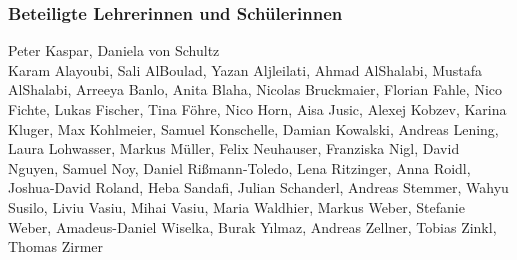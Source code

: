 \subsubsection*{Beteiligte Lehrerinnen und Schülerinnen}
Peter Kaspar, Daniela von Schultz\\
Karam Alayoubi, Sali AlBoulad, Yazan Aljleilati, Ahmad AlShalabi, Mustafa AlShalabi, Arreeya Banlo, Anita Blaha, Nicolas Bruckmaier, Florian Fahle, Nico Fichte, Lukas Fischer, Tina Föhre, Nico Horn, Aisa Jusic, Alexej Kobzev, Karina Kluger, Max Kohlmeier, Samuel Konschelle, Damian Kowalski, Andreas Lening, Laura Lohwasser, Markus Müller, Felix Neuhauser, Franziska Nigl, David Nguyen, Samuel Noy, Daniel Rißmann-Toledo, Lena Ritzinger, Anna Roidl, Joshua-David Roland, Heba Sandafi, Julian Schanderl, Andreas Stemmer, Wahyu Susilo, Liviu Vasiu, Mihai Vasiu, Maria Waldhier, Markus Weber, Stefanie Weber, Amadeus-Daniel Wiselka, Burak Yılmaz, Andreas Zellner, Tobias Zinkl, Thomas Zirmer 
